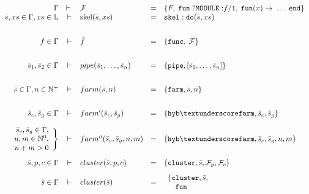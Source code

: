 \documentclass{article}
\begin{document}
\[
  \begin{array}{rclcl}
    \Gamma & \vdash{} & \mathcal{F} & = & \{F, \;\mathtt{fun\; ?MODULE:}f\mathtt{/1}, \;\mathtt{fun}(x)
    \rightarrow \;\dots \;\mathtt{end}\} \\
    \bar{s},xs \in \Gamma, xs \in \mathbb{L} & \vdash & \mathrm{skel}(\bar{s}, xs) & = & \mathtt{skel:do}(\bar{s}, xs) \\[2em]
    f \in \Gamma & \vdash & \bar{f} & = & \{\mathtt{func},\; \mathcal{F}\} \\[2em]
    \bar{s}_1,\bar{s}_2 \in \Gamma & \vdash & pipe(\bar{s}_1,\dots,\bar{s}_n) & = & \{\mathtt{pipe}, [\bar{s}_1,\dots,\bar{s}_n]\} \\[2em]
    \bar{s} \in \Gamma, n \in \mathbb{N}^{+} & \vdash & farm(\bar{s}, n) & = & \{\mathtt{farm}, \bar{s}, n\} \\[2em]
    \bar{s}_c,\bar{s}_g \in \Gamma & \vdash & farm'(\bar{s}_c, \bar{s}_g) & = &
                                                               \{\mathtt{hyb\textunderscore
                                                               farm}, \bar{s}_c,
                                                               \bar{s}_g\} \\[1em]
    \begin{array}{r}
      \bar{s}_c,\bar{s}_g \in \Gamma, \\ 
      n,m \in \mathbb{N}^{0}, \\
      n + m > 0
    \end{array} \Bigg\} & \vdash & farm''(\bar{s}_c, \bar{s}_g, n, m) & = &
                                                               \{\mathtt{hyb\textunderscore
                                                               farm}, \bar{s}_c,
                                                               \bar{s}_g, n, m\} \\[2em]
    \bar{s}, p, c \in \Gamma & \vdash & cluster(\bar{s},p,c) & = & \{\mathtt{cluster}, \bar{s},
                                                                                 \mathcal{F}_p,
                                                                                 \mathcal{F}_c\}
    \\[.8em]
    \bar{s} \in \Gamma & \vdash & cluster(\bar{s}) & = &
                                                         \begin{array}{l}
                                                           \{\mathtt{cluster}, \bar{s}, \\
                                                           \quad \mathtt{fun\;
}
\end{array}
\end{array}\]
\end{document}

